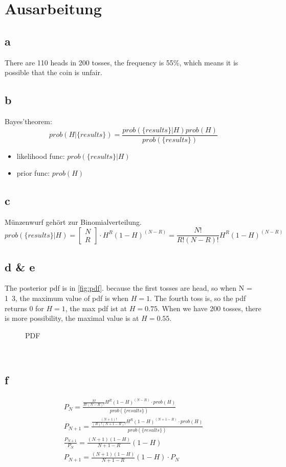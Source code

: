 \chapter{Ausarbeitung}
\section{a}
There are 110 heads in 200 tosses, the frequency is 55\%, which means it is possible that the coin is unfair.
\section{b}
Bayes'theorem:
\begin{equation*}
	prob(H|\{results\}) = \frac{prob(\{results\}|H) prob(H)}{prob(\{results\})}
\end{equation*}
\begin{itemize}
	\item likelihood func: $prob(\{results\}|H)$
	\item prior func: $prob(H)$
\end{itemize}
\section{c}
Münzenwurf gehört zur Binomialverteilung.
\begin{equation*}
	prob(\{results\}|H) = \begin{bmatrix}
		N \\
		R
	\end{bmatrix} \cdot H^R (1-H)^(N-R) = \frac{N!}{R!(N-R)!}H^R(1-H)^{(N-R)}
\end{equation*}
\section{d \& e}
The posterior pdf is in \autoref{fig:pdf}. because the first tosses are head, so when N = 1~3, the maximum value of pdf is when $H = 1$. The fourth toss is, so the pdf returns 0 for $H = 1$, the max pdf ist at $H = 0.75$. When we have 200 tosses, there is more possibility, the maximal value is at $H = 0.55$.
\begin{figure}[htpb]\centering
	\caption{PDF}
	\label{fig:pdf}
\end{figure}\\
\section{f}
\begin{gather*}
	P_{N} = \frac{\frac{N!}{R!(N-R)!}H^R(1-H)^{(N-R)} \cdot prob(H)}{prob(\{results\})} \\
	P_{N+1} = \frac{\frac{(N+1)!}{(R)!(N+1-R)!}H^{R}(1-H)^{(N+1-R)} \cdot prob(H)}{prob(\{results\})} \\
	\frac{P_{N+1}}{P_{N}} = \frac{(N+1)(1-H)}{N+1-R}(1-H) \\
	P_{N+1} = \frac{(N+1)(1-H)}{N+1-R}(1-H) \cdot P_{N}
\end{gather*}
